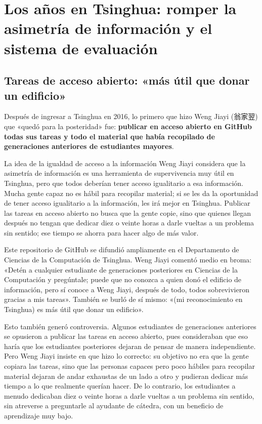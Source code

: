 \section{Los años en Tsinghua: romper la asimetría de información y el sistema de evaluación}

\subsection{Tareas de acceso abierto: «más útil que donar un edificio»}

Después de ingresar a Tsinghua en 2016, lo primero que hizo Weng Jiayi (翁家翌) que «quedó para la posteridad» fue: \textbf{publicar en acceso abierto en GitHub todas sus tareas y todo el material que había recopilado de generaciones anteriores de estudiantes mayores}.

\begin{importantbox}{La idea de la igualdad de acceso a la información}
Weng Jiayi considera que la asimetría de información es una herramienta de supervivencia muy útil en Tsinghua, pero que todos deberían tener acceso igualitario a esa información. Mucha gente capaz no es hábil para recopilar material; si se les da la oportunidad de tener acceso igualitario a la información, les irá mejor en Tsinghua. Publicar las tareas en acceso abierto no busca que la gente copie, sino que quienes llegan después no tengan que dedicar diez o veinte horas a darle vueltas a un problema sin sentido; ese tiempo se ahorra para hacer algo de más valor.
\end{importantbox}

Este repositorio de GitHub se difundió ampliamente en el Departamento de Ciencias de la Computación de Tsinghua. Weng Jiayi comentó medio en broma: «Detén a cualquier estudiante de generaciones posteriores en Ciencias de la Computación y pregúntale; puede que no conozca a quien donó el edificio de información, pero sí conoce a Weng Jiayi, después de todo, todos sobrevivieron gracias a mis tareas». También se burló de sí mismo: «(mi reconocimiento en Tsinghua) es más útil que donar un edificio».

Esto también generó controversia. Algunos estudiantes de generaciones anteriores se opusieron a publicar las tareas en acceso abierto, pues consideraban que eso haría que los estudiantes posteriores dejaran de pensar de manera independiente. Pero Weng Jiayi insiste en que hizo lo correcto: su objetivo no era que la gente copiara las tareas, sino que las personas capaces pero poco hábiles para recopilar material dejaran de andar exhaustas de un lado a otro y pudieran dedicar más tiempo a lo que realmente querían hacer. De lo contrario, los estudiantes a menudo dedicaban diez o veinte horas a darle vueltas a un problema sin sentido, sin atreverse a preguntarle al ayudante de cátedra, con un beneficio de aprendizaje muy bajo.

